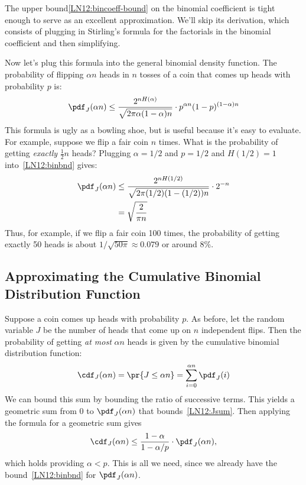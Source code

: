 The upper bound\eqref{LN12:bincoeff-bound} on the binomial coefficient is tight
enough to serve as an excellent approximation.  We'll skip its derivation,
which consists of plugging in Stirling's formula for the factorials in the
binomial coefficient and then simplifying.

Now let's plug this formula into the general binomial density
function.  The probability of flipping $\alpha n$ heads in $n$ tosses
of a coin that comes up heads with probability $p$ is:
%
\begin{equation}\label{LN12:binbnd}
\pdf_J(\alpha n) \leq
        \frac{2^{n H(\alpha)}}{\sqrt{2 \pi \alpha (1 - \alpha) n}} 
        \cdot p^{\alpha n} (1-p)^{(1 - \alpha) n}
\end{equation}
%
This formula is ugly as a bowling shoe, but is useful because it's easy to
evaluate.  For example, suppose we flip a fair coin $n$ times.  What is
the probability of getting \textit{exactly} $\frac{1}{2}n$ heads?
Plugging $\alpha = 1/2$ and $p = 1/2$ and $H(1/2) = 1$ into~\eqref{LN12:binbnd}
gives:
%
\begin{align*}
\pdf_J(\alpha n) & \leq
        \frac{2^{n H(1/2)}}{\sqrt{2 \pi (1/2) (1 - (1/2)) n}}
        \cdot 2^{-n} \\
        & = \sqrt{\frac{2}{\pi n}}
\end{align*}
%
Thus, for example, if we flip a fair coin 100 times, the probability
of getting exactly 50 heads is about $1 / \sqrt{50 \pi} \approx 0.079$
or around 8\%.

\subsection{Approximating the Cumulative Binomial Distribution Function}

Suppose a coin comes up heads with probability $p$.  As before, let
the random variable $J$ be the number of heads that come up on $n$
independent flips.  Then the probability of getting \textit{at most}
$\alpha n$ heads is given by the cumulative binomial distribution function:
%
\begin{equation}\label{LN12:Jsum}
\cdf_J(\alpha n) = \pr{J \leq \alpha n} = \sum_{i = 0}^{\alpha n} \pdf_J(i)
\end{equation}
We can bound this sum by bounding the ratio of successive terms.  This
yields a geometric sum from 0 to $\pdf_J(\alpha n)$ that
bounds~\eqref{LN12:Jsum}.  Then applying the formula for a geometric sum gives
\begin{equation}\label{LN12:nH}
\cdf_J(\alpha n)
         \leq \frac{1 - \alpha}{1 - \alpha / p} \cdot \pdf_J(\alpha n),
\end{equation}
which holds providing $\alpha < p$.  This is all we need, since we already
have the bound~\eqref{LN12:binbnd} for $\pdf_J(\alpha n)$.


